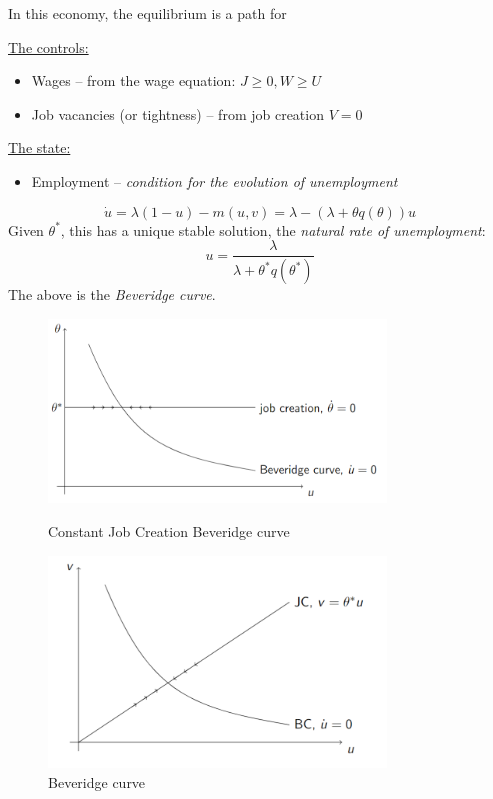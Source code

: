 In this economy, the equilibrium is a path for

\underline{The controls:}
\begin{itemize}
  \item Wages -- from the wage equation: $J \geq 0, W \geq U$
  \item Job vacancies (or tightness) -- from job creation $V = 0$
\end{itemize}

\underline{The state:}
\begin{itemize}
  \item Employment -- \textit{condition for the evolution of unemployment}
\end{itemize}
\[
\dot{u} = \lambda (1 - u) - m(u, v) = \lambda - (\lambda + \theta q(\theta))u
\]
Given $\theta^*$, this has a unique stable solution, the \textit{natural rate of unemployment}:
\[
u = \frac{\lambda}{\lambda + \theta^* q(\theta^*)}
\]
The above is the \textit{Beveridge curve}.

\begin{figure}[!htbp]
    \centering
    \begin{minipage}[b]{0.45\textwidth}
        \includegraphics[width=0.8\textwidth]{figures/constantjobcreation.png}
        \caption{Constant Job Creation Beveridge curve}
    \end{minipage}
    \begin{minipage}[b]{0.4\textwidth}
        \includegraphics[width=0.8\textwidth]{figures/beveragecurve.png}
        \caption{Beveridge curve}
    \end{minipage}
\end{figure}

